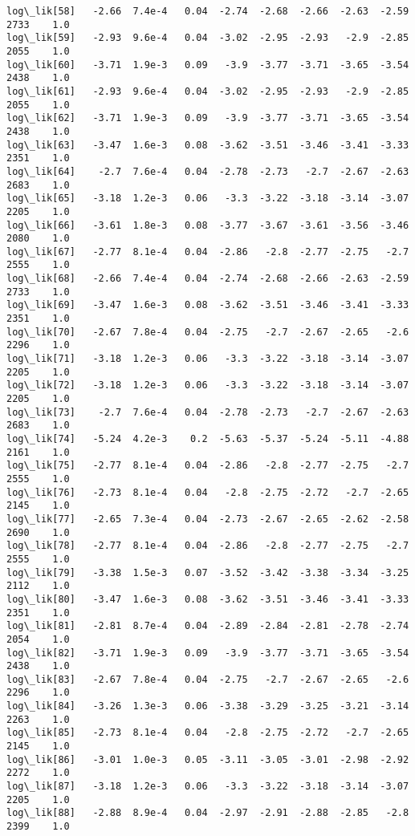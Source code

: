 \documentclass[11pt]{article}
\begin{document}
\begin{Verbatim}[commandchars=\\\{\}]
log\_lik[58]   -2.66  7.4e-4   0.04  -2.74  -2.68  -2.66  -2.63  -2.59   2733    1.0
log\_lik[59]   -2.93  9.6e-4   0.04  -3.02  -2.95  -2.93   -2.9  -2.85   2055    1.0
log\_lik[60]   -3.71  1.9e-3   0.09   -3.9  -3.77  -3.71  -3.65  -3.54   2438    1.0
log\_lik[61]   -2.93  9.6e-4   0.04  -3.02  -2.95  -2.93   -2.9  -2.85   2055    1.0
log\_lik[62]   -3.71  1.9e-3   0.09   -3.9  -3.77  -3.71  -3.65  -3.54   2438    1.0
log\_lik[63]   -3.47  1.6e-3   0.08  -3.62  -3.51  -3.46  -3.41  -3.33   2351    1.0
log\_lik[64]    -2.7  7.6e-4   0.04  -2.78  -2.73   -2.7  -2.67  -2.63   2683    1.0
log\_lik[65]   -3.18  1.2e-3   0.06   -3.3  -3.22  -3.18  -3.14  -3.07   2205    1.0
log\_lik[66]   -3.61  1.8e-3   0.08  -3.77  -3.67  -3.61  -3.56  -3.46   2080    1.0
log\_lik[67]   -2.77  8.1e-4   0.04  -2.86   -2.8  -2.77  -2.75   -2.7   2555    1.0
log\_lik[68]   -2.66  7.4e-4   0.04  -2.74  -2.68  -2.66  -2.63  -2.59   2733    1.0
log\_lik[69]   -3.47  1.6e-3   0.08  -3.62  -3.51  -3.46  -3.41  -3.33   2351    1.0
log\_lik[70]   -2.67  7.8e-4   0.04  -2.75   -2.7  -2.67  -2.65   -2.6   2296    1.0
log\_lik[71]   -3.18  1.2e-3   0.06   -3.3  -3.22  -3.18  -3.14  -3.07   2205    1.0
log\_lik[72]   -3.18  1.2e-3   0.06   -3.3  -3.22  -3.18  -3.14  -3.07   2205    1.0
log\_lik[73]    -2.7  7.6e-4   0.04  -2.78  -2.73   -2.7  -2.67  -2.63   2683    1.0
log\_lik[74]   -5.24  4.2e-3    0.2  -5.63  -5.37  -5.24  -5.11  -4.88   2161    1.0
log\_lik[75]   -2.77  8.1e-4   0.04  -2.86   -2.8  -2.77  -2.75   -2.7   2555    1.0
log\_lik[76]   -2.73  8.1e-4   0.04   -2.8  -2.75  -2.72   -2.7  -2.65   2145    1.0
log\_lik[77]   -2.65  7.3e-4   0.04  -2.73  -2.67  -2.65  -2.62  -2.58   2690    1.0
log\_lik[78]   -2.77  8.1e-4   0.04  -2.86   -2.8  -2.77  -2.75   -2.7   2555    1.0
log\_lik[79]   -3.38  1.5e-3   0.07  -3.52  -3.42  -3.38  -3.34  -3.25   2112    1.0
log\_lik[80]   -3.47  1.6e-3   0.08  -3.62  -3.51  -3.46  -3.41  -3.33   2351    1.0
log\_lik[81]   -2.81  8.7e-4   0.04  -2.89  -2.84  -2.81  -2.78  -2.74   2054    1.0
log\_lik[82]   -3.71  1.9e-3   0.09   -3.9  -3.77  -3.71  -3.65  -3.54   2438    1.0
log\_lik[83]   -2.67  7.8e-4   0.04  -2.75   -2.7  -2.67  -2.65   -2.6   2296    1.0
log\_lik[84]   -3.26  1.3e-3   0.06  -3.38  -3.29  -3.25  -3.21  -3.14   2263    1.0
log\_lik[85]   -2.73  8.1e-4   0.04   -2.8  -2.75  -2.72   -2.7  -2.65   2145    1.0
log\_lik[86]   -3.01  1.0e-3   0.05  -3.11  -3.05  -3.01  -2.98  -2.92   2272    1.0
log\_lik[87]   -3.18  1.2e-3   0.06   -3.3  -3.22  -3.18  -3.14  -3.07   2205    1.0
log\_lik[88]   -2.88  8.9e-4   0.04  -2.97  -2.91  -2.88  -2.85   -2.8   2399    1.0

\end{Verbatim}
\end{document}
